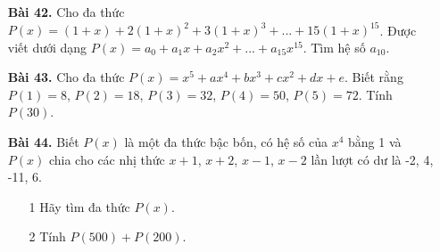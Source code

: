 \documentclass[12pt,a4paper]{article}
\begin{document}
\begin{enumerate}
\item[\textbf{Bài 42.}] Cho đa thức $P(x) = (1+x) + 2(1+x)^2 + 3(1+x)^3 + ... + 15(1+x)^{15}$. Được viết dưới dạng $P(x) = a_0 + a_1x + a_2x^2 +...+a_{15}x^{15}$. Tìm hệ số $a_{10}$.
\item[\textbf{Bài 43.}] Cho đa thức $P(x) = x^5 + ax^4 + bx^3 + cx^2 + dx + e.$ Biết rằng $P(1) = 8$, $P(2) = 18$, $P(3) = 32$, $P(4) = 50$, $P(5) = 72$. Tính $P(30)$.
\item[\textbf{Bài 44.}] Biết $P(x)$ là một đa thức bậc bốn, có hệ số của $x^4$ bằng 1 và $P(x)$ chia cho các nhị thức $x+1$, $x+2$, $x-1$, $x-2$ lần lượt có dư là -2, 4, -11, 6.
\begin{enumerate}
    \item[1] Hãy tìm đa thức $P(x)$.
    \item[2] Tính $P(500) + P(200)$. 
\end{enumerate}
\end{enumerate}
\newpage
\end{document}
